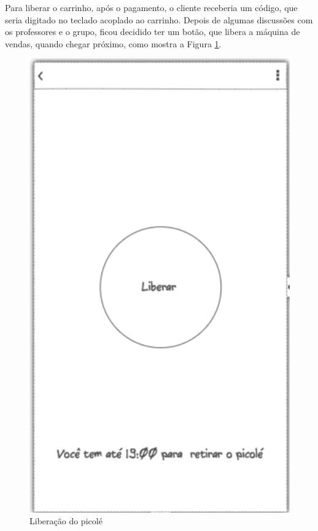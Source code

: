 \newpage

Para liberar o carrinho, após o pagamento, o cliente receberia um código, que seria digitado no teclado acoplado ao carrinho. Depois de algumas discussões com os professores e o grupo, ficou decidido ter um botão, que libera a máquina de vendas, quando chegar próximo, como mostra a Figura \ref{fig:liberacao}.

\begin{figure}[H]
	\centering
    \includegraphics[scale=0.7]{figuras/liberacao}
	\caption{Liberação do picolé}
    \label{fig:liberacao}
\end{figure}


